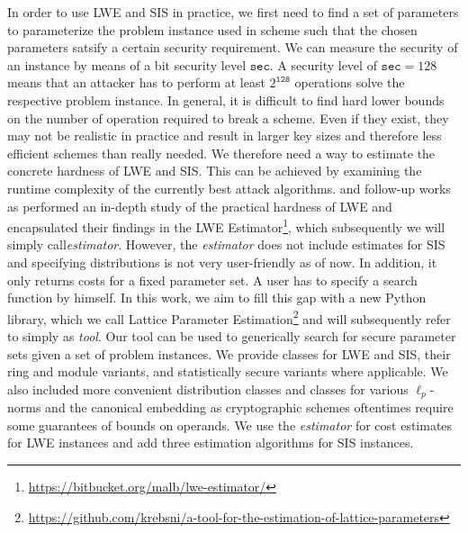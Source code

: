 \documentclass[
  a4paper,  %
  twoside,  %
  bibliography=totoc,
  headsepline,
  cleardoublepage=empty,
  parskip=half,
  draft=false
]{scrbook}
\begin{document}



In order to use LWE and SIS in practice, we first need to find a set of parameters to parameterize the problem instance used in scheme such that the chosen parameters satsify a certain security requirement. We can measure the security of an instance by means of a bit security level $\texttt{sec}$. A security level of $\texttt{sec} = 128$ means that an attacker has to perform at least $2^\texttt{128}$ operations solve the respective problem instance. In general, it is difficult to find hard lower bounds on the number of operation required to break a scheme. Even if they exist, they may not be realistic in practice and result in larger key sizes and therefore less efficient schemes than really needed. We therefore need a way to estimate the concrete hardness of LWE and SIS. This can be achieved by examining the runtime complexity of the currently best attack algorithms. \citet{APS15} and follow-up works as \cite{Alb17,BBGS19} performed an in-depth study of the practical hardness of LWE and encapsulated their findings in the LWE Estimator\footnote{\url{https://bitbucket.org/malb/lwe-estimator/}}, which subsequently we will simply call\textit{estimator}. However, the \textit{estimator} does not include estimates for SIS and specifying distributions is not very user-friendly as of now. In addition, it only returns costs for a fixed parameter set. A user has to specify a search function by himself. In this work, we aim to fill this gap with a new Python library, which we call Lattice Parameter Estimation\footnote{\url{https://github.com/krebsni/a-tool-for-the-estimation-of-lattice-parameters}} and will subsequently refer to simply as \textit{tool}. Our tool can be used to generically search for secure parameter sets given a set of problem instances. We provide classes for LWE and SIS, their ring and module variants, and statistically secure variants where applicable. We also included more convenient distribution classes and classes for various $\ell_p$-norms and the canonical embedding as cryptographic schemes oftentimes require some guarantees of bounds on operands. We use the \textit{estimator} for cost estimates for LWE instances and add three estimation algorithms for SIS instances.
\end{document}
